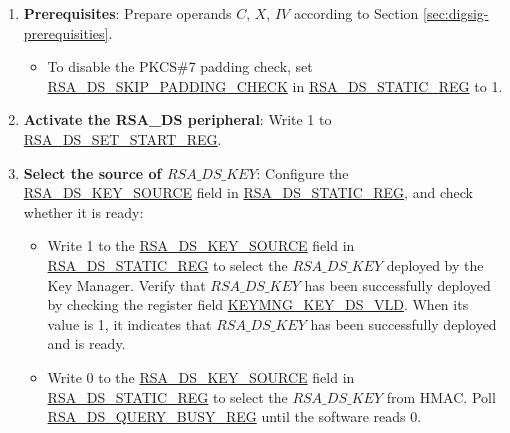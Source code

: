 \documentclass[main\_\_EN.tex]{subfiles}
\begin{document}
\begin{enumerate}

    \item {\bfseries Prerequisites}: Prepare operands \begin{math}C\end{math}, \begin{math}X\end{math}, \begin{math}IV\end{math} according to Section \ref{sec:digsig-prerequisities}.
    \begin{itemize}
        \item To disable the PKCS\#7 padding check, set \hyperref[fielddesc:RSADSSKIPPADDINGCHECK]{RSA\_DS\_SKIP\_PADDING\_CHECK} in \hyperref[regdesc:RSADSSTATICREG]{RSA\_DS\_STATIC\_REG} to 1.
    \end{itemize}

    \item {\bfseries Activate the RSA\_DS peripheral}: Write 1 to \hyperref[regdesc:RSADSSETSTARTREG]{RSA\_DS\_SET\_START\_REG}.

    \item {\bfseries Select the source of \begin{math}RSA\_DS\_KEY\end{math}}: Configure the \hyperref[fielddesc:RSADSKEYSOURCE]{RSA\_DS\_KEY\_SOURCE} field in \hyperref[regdesc:RSADSSTATICREG]{RSA\_DS\_STATIC\_REG}, and check whether it is ready:
    \begin{itemize}
        \item Write 1 to the \hyperref[fielddesc:RSADSKEYSOURCE]{RSA\_DS\_KEY\_SOURCE} field in \hyperref[regdesc:RSADSSTATICREG]{RSA\_DS\_STATIC\_REG} to select the \begin{math}RSA\_DS\_KEY\end{math} deployed by the Key Manager. Verify that \begin{math}RSA\_DS\_KEY\end{math} has been successfully deployed by checking the register field \hyperref[fielddesc:KEYMNGKEYDSVLD]{KEYMNG\_KEY\_DS\_VLD}. When its value is 1, it indicates that \begin{math}RSA\_DS\_KEY\end{math} has been successfully deployed and is ready.
        \item Write 0 to the \hyperref[fielddesc:RSADSKEYSOURCE]{RSA\_DS\_KEY\_SOURCE} field in \hyperref[regdesc:RSADSSTATICREG]{RSA\_DS\_STATIC\_REG} to select the \begin{math}RSA\_DS\_KEY\end{math} from HMAC. Poll \hyperref[regdesc:RSADSQUERYBUSYREG]{RSA\_DS\_QUERY\_BUSY\_REG} until the software reads 0.
    \end{itemize}


\end{enumerate}
\end{document}
